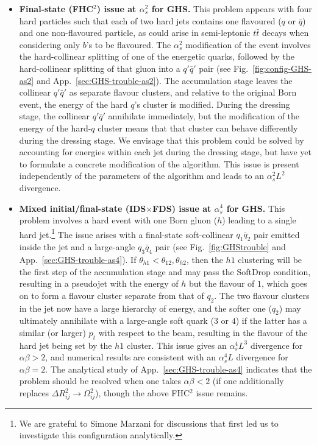 \documentclass[nofootinbib,twocolumn,preprintnumbers,superscriptaddress,aps]{revtex4-2}
\newcommand{\as}{\alpha_s}
\begin{document}
\begin{itemize}
\item \textbf{Final-state (FHC$^2$) issue at $\as^2$ for GHS.}
  This problem
  appears with four hard particles such that each of two hard jets
  contains one flavoured ($q$ or $\bar q$) and one non-flavoured
  particle, as could arise in semi-leptonic $t\bar t$ decays when
  considering only $b$'s to be flavoured.
  The $\as^2$ modification of the event involves the hard-collinear
  splitting of one of the energetic quarks, followed by the
  hard-collinear splitting of that gluon into a $q'\bar q'$ pair
  (see Fig.~\ref{fig:config-GHS-as2} and App.~\ref{sec:GHS-trouble-as2}).
  The accumulation stage leaves the collinear $q'\bar q'$ as separate
  flavour clusters, and relative to the original Born event, the
  energy of the hard $q$'s cluster is modified.
  During the dressing stage, the collinear $q'\bar q'$ annihilate
  immediately, but the modification of the energy of the hard-$q$
  cluster means that that cluster can behave differently during the
  dressing stage. 
  We envisage that this problem could be solved by accounting for
  energies within each jet during the dressing stage, but have yet to
  formulate a concrete modification of the algorithm.
  This issue is present independently of the parameters of the
  algorithm and leads to an $\as^2 L^2$ divergence. 

\item \textbf{Mixed initial/final-state (IDS$\times$FDS) issue at $\as^4$ for GHS.}
  This problem
  involves a hard event with one Born gluon ($h$) leading to a single
  hard jet.\footnote{We are grateful to Simone Marzani for discussions
    that first led us to investigate this configuration analytically.}
  The issue arises with a final-state soft-collinear $q_1\bar q_2$
  pair emitted inside the jet and a large-angle $q_3\bar q_4$ pair
  (see Fig.~\ref{fig:GHStrouble} and App.~\ref{sec:GHS-trouble-as4}).
  If $\theta_{h1} < \theta_{12},\theta_{h2}$, then the $h1$ clustering
  will
  be the first step of the accumulation stage and may pass the
  SoftDrop condition, resulting in a pseudojet with the energy of $h$
  but the flavour of $1$, which goes on to form a flavour cluster
  separate from that of $q_2$.
  The two flavour clusters in the jet now have a large hierarchy of
  energy, and the softer one ($q_2$) may ultimately annihilate with a
  large-angle soft quark ($3$ or $4$) if the latter has a similar
  (or larger)
  $p_t$ with respect to the beam, resulting in the flavour of the hard
  jet being set by the $h1$ cluster.
  This issue gives an $\as^4 L^3$ divergence for $\alpha\beta>2$,
  and numerical results are consistent with an $\as^4 L$
  divergence for $\alpha\beta=2$.
  The analytical study of App.~\ref{sec:GHS-trouble-as4} indicates
  that the problem should be resolved when one takes $\alpha\beta < 2$
  (if one additionally replaces $\Delta R_{ij}^2 \to \Omega_{ij}^2$),
  though the above FHC$^2$ issue remains.
\end{itemize}
\end{document}
